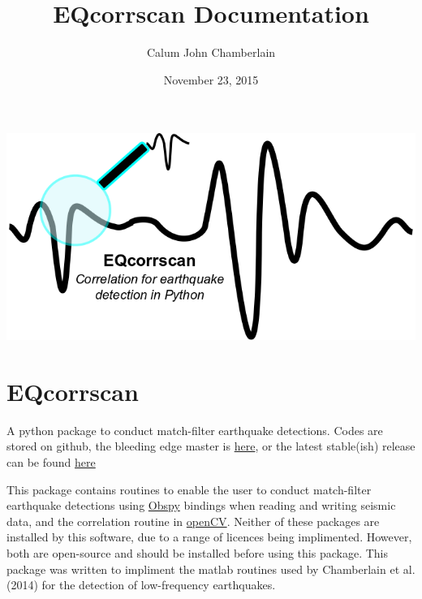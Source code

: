 \documentclass[a4paper,10pt,english]{sphinxmanual}
\title{EQcorrscan Documentation}
\date{November 23, 2015}
\author{Calum John Chamberlain}
\begin{document}
\maketitle
\tableofcontents
{}\label{index::doc}

\href{https://github.com/calum-chamberlain/EQcorrscan/releases}{\includegraphics{EQcorrscan_logo.png}}

\chapter{EQcorrscan}
\label{index:eqcorrscan}\label{index:welcome-to-eqcorrscan-s-documentation}
A python package to conduct match-filter earthquake detections.  Codes are stored
on github, the bleeding edge master is \href{https://github.com/calum-chamberlain/EQcorrscan}{here}, or the latest stable(ish) release
can be found \href{https://github.com/calum-chamberlain/EQcorrscan/releases}{here}

This package contains routines to enable the user to conduct match-filter earthquake
detections using \href{https://github.com/obspy/obspy/wiki}{Obspy} bindings when reading
and writing seismic data, and the correlation routine in \href{http://opencv.org/}{openCV}.
Neither of these packages are installed by this software, due to a range of
licences being implimented.  However, both are open-source and should be installed
before using this package.  This package was written to impliment the matlab routines
used by Chamberlain et al. (2014) for the detection of low-frequency earthquakes.
\end{document}
